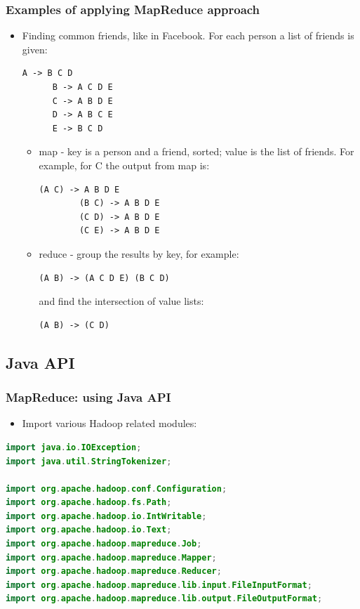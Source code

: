 \documentclass{beamer}
\begin{document}
\begin{frame}[fragile]
  \frametitle{Examples of applying MapReduce approach}
  \begin{itemize}
  \item {\color{mycolordef}Finding common friends, like in Facebook. } For each person a list of friends is given:
    \begin{lstlisting}[frame=single, basicstyle=\tiny]
      A -> B C D
      B -> A C D E
      C -> A B D E
      D -> A B C E
      E -> B C D
    \end{lstlisting}
    
    \begin{itemize}
    \item map - key is a person and a friend, sorted; value is the list of friends. For example, for C the output from map is:
      \begin{lstlisting}[frame=single, basicstyle=\tiny]
        (A C) -> A B D E
        (B C) -> A B D E
        (C D) -> A B D E
        (C E) -> A B D E
      \end{lstlisting}
    \item reduce - group the results by key, for example:
      \begin{lstlisting}[frame=single, basicstyle=\tiny]
        (A B) -> (A C D E) (B C D)
      \end{lstlisting}
      and find the intersection of value lists:
      \begin{lstlisting}[frame=single, basicstyle=\tiny]
        (A B) -> (C D)
      \end{lstlisting}
    \end{itemize}
  \end{itemize}
\end{frame}


\subsection{Java API}
\begin{frame}[fragile]
 \frametitle{MapReduce: using Java API}

\begin{itemize}
\item Import various Hadoop related modules:
\end{itemize}
{\color{mycolorcode}
  \begin{lstlisting}[frame=single, basicstyle=\tiny,language=java]
import java.io.IOException;
import java.util.StringTokenizer;

import org.apache.hadoop.conf.Configuration;
import org.apache.hadoop.fs.Path;
import org.apache.hadoop.io.IntWritable;
import org.apache.hadoop.io.Text;
import org.apache.hadoop.mapreduce.Job;
import org.apache.hadoop.mapreduce.Mapper;
import org.apache.hadoop.mapreduce.Reducer;
import org.apache.hadoop.mapreduce.lib.input.FileInputFormat;
import org.apache.hadoop.mapreduce.lib.output.FileOutputFormat;
  \end{lstlisting}
}
\end{frame}
\end{document}
